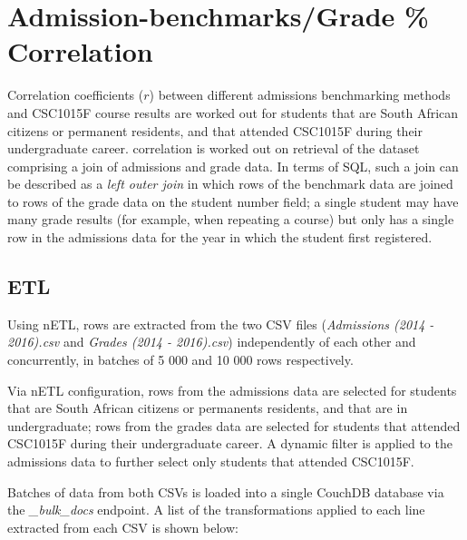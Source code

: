 \section{Admission-benchmarks/Grade \% Correlation}
Correlation coefficients ($r$) between different admissions benchmarking methods and CSC1015F course results are worked out for students that are South African citizens or permanent residents, and that attended CSC1015F during their undergraduate career. correlation is worked out on retrieval of the dataset comprising a join of admissions and grade data. In terms of SQL, such a join can be described as a \textit{left outer join} in which rows of the benchmark data are joined to rows of the grade data on the student number field; a single student may have many grade results (for example, when repeating a course) but only has a single row in the admissions data for the year in which the student first registered.

\subsection{ETL}
Using nETL, rows are extracted from the two CSV files (\textit{Admissions (2014 - 2016).csv} and \textit{Grades (2014 - 2016).csv}) independently of each other and concurrently, in batches of 5 000 and 10 000 rows respectively.

Via nETL configuration, rows from the admissions data are selected for students that are South African citizens or permanents residents, and that are in undergraduate; rows from the grades data are selected for students that attended CSC1015F during their undergraduate career. A dynamic filter is applied to the admissions data to further select only students that attended CSC1015F.

Batches of data from both CSVs is loaded into a single CouchDB database via the \textit{\_bulk\_docs} endpoint. A list of the transformations applied to each line extracted from each CSV is shown below:

